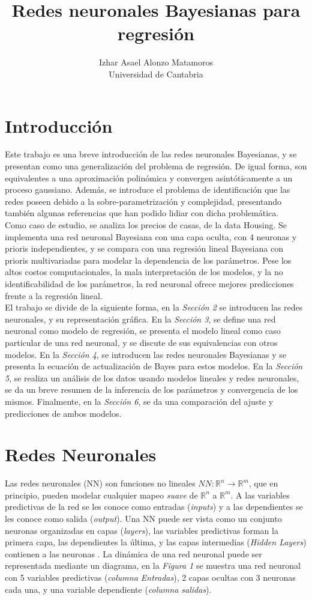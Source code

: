 \documentclass[nojss]{jss}
\author{Izhar Asael Alonzo Matamoros \\  Universidad de Cantabria \\}
\title{\huge Redes neuronales Bayesianas para regresión}
\begin{document}
\section{Introducción}
Este trabajo es una breve introducción de las redes neuronales Bayesianas, y se presentan como una generalización del problema de regresión. De igual forma, son equivalentes a una aproximación polinómica y convergen asintóticamente a un proceso gaussiano. Además, se introduce el problema de identificación que las redes poseen debido a la sobre-parametrización y complejidad, presentando también algunas referencias que han podido lidiar con dicha problemática.\\

Como caso de estudio, se analiza los precios de casas, de la data Housing. Se implementa una red neuronal Bayesiana con una capa oculta, con 4 neuronas y prioris independientes, y se compara con una regresión lineal Bayesiana con prioris multivariadas para modelar la dependencia de los parámetros. Pese los altos costos computacionales, la mala interpretación de los modelos, y la no identificabilidad de los parámetros, la red neuronal ofrece mejores predicciones frente a la regresión lineal.\\

El trabajo se divide de la siguiente forma, en la \textit{Sección 2} se introducen las redes neuronales, y su representación gráfica. En la \textit{Sección 3}, se define una red neuronal como modelo de regresión, se presenta el modelo lineal como caso particular de una red neuronal, y se discute de sus equivalencias con otros modelos. En la \textit{Sección 4}, se introducen las redes neuronales Bayesianas y se presenta la ecuación de actualización de Bayes para estos modelos. En la \textit{Sección 5}, se realiza un análisis de los datos usando modelos lineales y redes neuronales, se da un breve resumen de la inferencia de los parámetros y convergencia de los mismos. Finalmente, en la \textit{Sección 6}, se da una comparación del ajuste y predicciones de ambos modelos.
  
\section{Redes Neuronales}

Las redes neuronales (NN) son funciones no lineales $NN:\mathbb{R}^n \rightarrow \mathbb{R}^m$, que en principio, pueden modelar cualquier mapeo \textit{suave} de  $\mathbb{R}^n$ a $\mathbb{R}^m$. A las variables predictivas de la red se les conoce como entradas (\textit{inputs}) y a las  dependientes se les conoce como salida (\textit{output}). Una NN puede ser vista como un conjunto neuronas organizadas en capas (\textit{layers}), las variables predictivas forman la primera capa, las dependientes la  última, y las capas intermedias (\textit{Hidden Layers}) contienen a las neuronas \cite{Paige2001}. La dinámica de una red neuronal puede ser representada mediante un diagrama, en la \textit{Figura 1} se muestra una red neuronal con 5 variables predictivas (\textit{columna Entradas}), 2 capas ocultas con 3 neuronas cada una, y una variable dependiente (\textit{columna salidas}).
\end{document}
